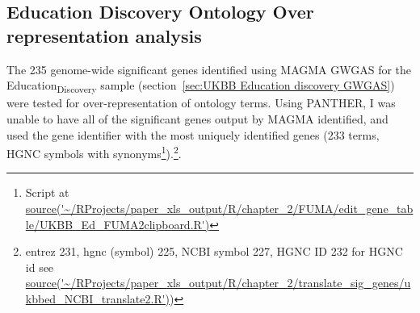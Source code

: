 
        
   

\subsection{Education Discovery Ontology Over representation analysis}
      The 235 genome-wide significant genes identified using MAGMA GWGAS for the Education\textsubscript{Discovery} sample (section~\ref{sec:UKBB Education discovery GWGAS}) were tested for over-representation of ontology terms. 
      Using PANTHER, I was unable to have all of the significant genes output by MAGMA identified, and used the gene identifier with the most uniquely identified genes  (233 terms, HGNC symbols with synonyms\footnote{ Script at \url{source('~/RProjects/paper_xls_output/R/chapter_2/FUMA/edit_gene_table/UKBB_Ed_FUMA2clipboard.R')}}).\footnote{entrez 231, hgnc (symbol) 225, NCBI symbol 227, HGNC ID 232 for HGNC id see \url{source('~/RProjects/paper_xls_output/R/chapter_2/translate_sig_genes/ukbbed_NCBI_translate2.R')})}.
        
